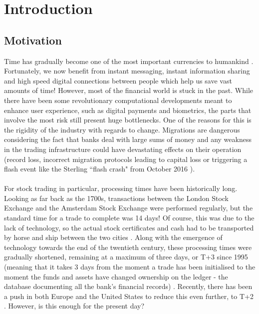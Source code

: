 \documentclass[12pt,twoside]{article}
\begin{document}

\cleardoublepage

\cleardoublepage

\newpage
\tableofcontents
\newpage

\section{Introduction}
\label{sec:Introduction}
\subsection{Motivation}
\label{sub:Motivation}
Time has gradually become one of the most important currencies to humankind \cite{mike}. Fortunately, we now benefit from instant messaging, instant information sharing and high speed digital connections between people which help us save vast amounts of time! However, most of the financial world is stuck in the past. While there have been some revolutionary computational developments meant to enhance user experience, such as digital payments and biometrics\cite{digitalfinance}, the parts that involve the most risk still present huge bottlenecks. One of the reasons for this is the rigidity of the industry with regards to change. Migrations are dangerous considering the fact that banks deal with large sums of money and any weakness in the trading infrastructure could have devastating effects on their operation (record loss, incorrect migration protocols leading to capital loss \cite{bankrisk} or triggering a flash event like the Sterling ``flash crash" from October 2016 \cite{flashcrash}).
\\ \\
For stock trading in particular, processing times have been historically long. Looking as far back as the 1700s, transactions between the London Stock Exchange and the Amsterdam Stock Exchange were performed regularly, but the standard time for a trade to complete was 14 days! Of course, this was due to the lack of technology, so the actual stock certificates and cash had to be transported by horse and ship between the two cities \cite{CHsuperold}. Along with the emergence of technology towards the end of the twentieth century, these processing times were gradually shortened, remaining at a maximum of three days, or T+3 since 1995 (meaning that it takes 3 days from the moment a trade has been initialised to the moment the funds and assets have changed ownership on the ledger - the database documenting all the bank's financial records) \cite{TTimes}. Recently, there has been a push in both Europe and the United States to reduce this even further, to T+2 \cite{newTimes} \cite{newTimesUS}. However, is this enough for the present day?
\end{document}
